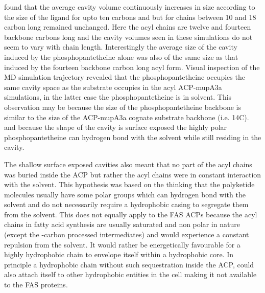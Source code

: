 \textcite{Chan2008} found that the average cavity volume continuously increases in size according to the size of the ligand for upto ten carbons and but for chains between 10 and 18 carbon long remained unchanged. Here the acyl chains are twelve and fourteen backbone carbons long and the cavity volumes seen in these simulations do not seem to vary with chain length. Interestingly the average size of the cavity induced by the phosphopantetheine alone was also of the same size as that induced by the fourteen backbone carbon long acyl form. Visual inspection of the MD simulation trajectory revealed that the phosphopantetheine occupies the same cavity space as the substrate occupies in the acyl ACP-mupA3a simulations, in the latter case the phosphopantetheine is in solvent. This observation may be because the size of the phosphopantetheine backbone is similar to the size of the ACP-mupA3a cognate substrate backbone (i.e. 14C). and because the shape of the cavity is surface exposed the highly polar phosphopantetheine can hydrogen bond with the solvent while still residing in the cavity.

The shallow surface exposed cavities also meant that no part of the acyl chains was buried inside the ACP but rather the acyl chains were in constant interaction with the solvent. This hypothesis was based on the thinking that the polyketide molecules usually have some polar groups which can hydrogen bond with the solvent and do not necessarily require a hydrophobic casing to segregate them from the solvent. This does not equally apply to the FAS ACPs because the acyl chains in fatty acid synthesis are usually saturated and non polar in nature (except the \bet-carbon processed intermediates) and would experience a constant repulsion from the solvent. It would rather be energetically favourable for a highly hydrophobic chain to envelope itself within a hydrophobic core. In principle a hydrophobic chain without such sequestration inside the ACP, could also attach itself to other hydrophobic entities in the cell making it not available to the FAS proteins. 

